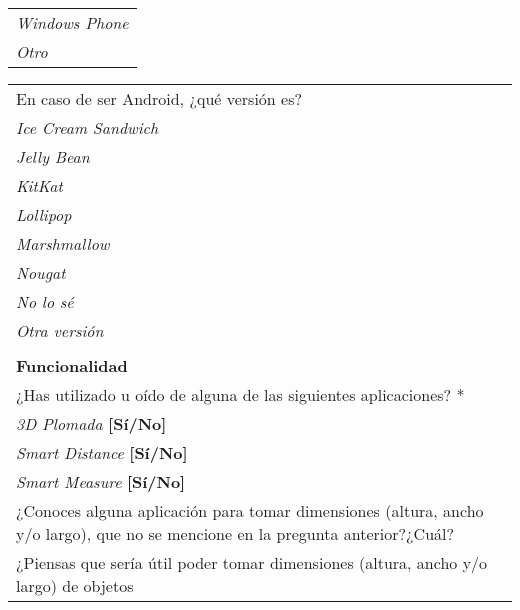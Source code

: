 \begin{center}
\begin{tabular}{|p{16cm}|}
        	 \hspace{1cm}\textit{Windows Phone}\\
        	 \hspace{1cm}\textit{Otro}\\
        	 \hline
    \end{tabular}
    \newpage
    \begin{tabular}{|p{16cm}|}
        	 \hline
        	 En caso de ser Android, ¿qué versión es?\\
        	 \hspace{1cm}\textit{Ice Cream Sandwich}\\
            \hspace{1cm}\textit{Jelly Bean}\\
        	 \hspace{1cm}\textit{KitKat}\\
        	 \hspace{1cm}\textit{Lollipop}\\
        	 \hspace{1cm}\textit{Marshmallow}\\
        	 \hspace{1cm}\textit{Nougat}\\
        	 \hspace{1cm}\textit{No lo sé}\\
        	 \hspace{1cm}\textit{Otra versión}\\
        	 \hline
            \rowcolor[rgb]{0.8,0.8,0.8}\\
            \rowcolor[rgb]{0.8,0.8,0.8}
            \textbf{\color{darkgray}Funcionalidad} \\ [0.3cm]
            ¿Has utilizado u oído de alguna de las siguientes aplicaciones? \textcolor{rojo}{*}\\
            \hspace{1cm}\textit{3D Plomada} \textbf{[Sí/No]}\\
            \hspace{1cm}\textit{Smart Distance} \textbf{[Sí/No]}\\
        	 \hspace{1cm}\textit{Smart Measure} \textbf{[Sí/No]}\\
	 \hline
	 ¿Conoces alguna aplicación para tomar dimensiones (altura, ancho y/o largo), que no se mencione
	  en la pregunta anterior?¿Cuál?\\
	  \hline
	  ¿Piensas que sería útil poder tomar dimensiones (altura, ancho y/o largo) de objetos

\end{tabular}
\end{center}

